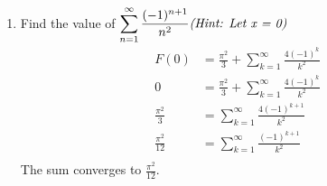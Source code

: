 \documentclass{article}
\begin{document}
\begin{enumerate}
\begin{enumerate}
\item Find the value of $\displaystyle \sum_{n=1}^\infty \frac{(-1)^{n+1}}{n^2} \text{\textit{(Hint: Let x = 0)}}$
\begin{align*}
F(0) &= \frac{\pi^2}{3} + \sum_{k=1}^\infty \frac{4(-1)^k}{k^2} \\
0 &= \frac{\pi^2}{3} + \sum_{k=1}^\infty \frac{4(-1)^k}{k^2} \\
 \frac{\pi^2}{3} &=  \sum_{k=1}^\infty \frac{4(-1)^{k+1}}{k^2} \\
 \frac{\pi^2}{12} &=  \sum_{k=1}^\infty \frac{(-1)^{k+1}}{k^2} \\
\end{align*}
The sum converges to $\frac{\pi^2}{12}$.
\end{enumerate}
\end{enumerate}
\end{document}
